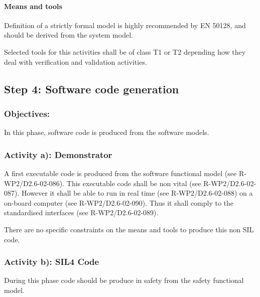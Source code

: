 \paragraph{Means and tools}
\label{sec:sw-means}

Definition of a strictly formal  model is highly recommended by EN 50128, and should be derived from  the system  model.


Selected tools for this activities shall  be of class T1 or T2  depending how they deal  with verification and validation activities.


\subsection{Step 4: Software code generation}
\label{sec:sw-code}



\subsubsection{Objectives:}
\label{sec:sw-req-objective}


In this phase, software code is produced from the software models.

\subsubsection{Activity a): Demonstrator}
\label{sec:demo-phase}

A first executable code is produced from the software functional model (see R-WP2/D2.6-02-086). This executable code shall be non vital (see R-WP2/D2.6-02-087). However it shall be able to run in real time (see R-WP2/D2.6-02-088) on a on-board computer (see R-WP2/D2.6-02-090).
Thus it shall comply to the standardised interfaces (see R-WP2/D2.6-02-089). 

There are no specific constraints on the means and tools to  produce this non SIL code.


\subsubsection{Activity b): SIL4 Code}
\label{sec:code-phase}

During this phase code should be produce in safety from the safety functional model.

